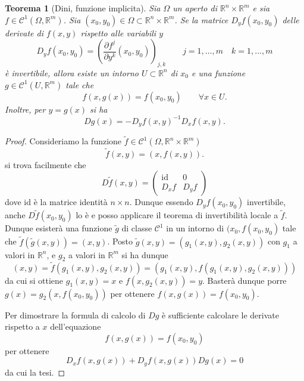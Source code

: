 \documentclass[italian]{article}
\newtheorem{theorem}{Teorema}
\theoremstyle{remark}
\newcommand{\Id}{{\mathrm{id}}}          %
\newcommand{\R}{{\mathbb R}}            %
\newcommand{\CC}{{\mathcal C}}           %
\begin{document}
\begin{theorem}[Dini, funzione implicita]
Sia $\Omega$ un aperto di $\R^n\times \R^m$ e sia $f\in
\CC^1(\Omega,\R^m)$. Sia $(x_0,y_0)\in\Omega\subset \R^n\times \R^m$.
Se la matrice $D_yf(x_0,y_0)$ delle derivate di $f(x,y)$ rispetto alle
variabili $y$
\[
D_yf(x_0,y_0)=\left(\frac{\partial f^j}{\partial y^k} (x_0,y_0)\right)_{j,k}
\qquad j=1,\ldots,m\quad k=1,\ldots,m
\]
\`e invertibile, allora esiste un intorno $U\subset \R^n$ di $x_0$
e una funzione $g\in\CC^1(U,\R^m)$
tale che
\[
        f(x,g(x))=f(x_0,y_0)\qquad \forall x\in U.
\]
Inoltre, per $y=g(x)$ si ha
\[
  Dg(x) = -D_y f(x,y)^{-1} D_x f(x,y).
\]
\end{theorem}
\begin{proof}
Consideriamo la funzione $\tilde f\in\CC^1(\Omega,\R^n\times\R^m)$
\[
        \tilde f(x,y)=(x,f(x,y)).
\]
si trova facilmente che 
\[      
        D\tilde f(x,y) =
        \left(
        \begin{array}{c|c}
        \Id & 0 \\ \hline
        D_x f & D_y f
        \end{array}
        \right)
\]
dove $\Id$ \`e la matrice identit\`a $n\times n$. 
Dunque essendo $D_y f(x_0,y_0)$ invertibile,
 anche $D\tilde f(x_0,y_0)$ lo \`e e
posso applicare il teorema di invertibilit\`a locale a $\tilde f$.
Dunque esister\`a una funzione $\tilde g$ di classe $\CC^1$ in un intorno di
$(x_0,f(x_0,y_0)$ 
tale che $\tilde f(\tilde
g(x,y))=(x,y)$.
Posto $\tilde g(x,y)=(g_1(x,y),g_2(x,y))$ con $g_1$ a valori in
$\R^n$, e $g_2$ a valori in $\R^m$ si ha dunque
\[
        (x,y) 
        = \tilde f(g_1(x,y),g_2(x,y))
        = (g_1(x,y),f(g_1(x,y),g_2(x,y)))
\]
da cui si ottiene $g_1(x,y)=x$ e
$f(x,g_2(x,y))=y$.
Baster\`a dunque porre $g(x)=g_2(x,f(x_0,y_0))$ per ottenere $f(x,g(x))=f(x_0,y_0)$.

Per dimostrare la formula di calcolo di $Dg$ \`e sufficiente
calcolare le derivate rispetto a $x$ dell'equazione
\[
  f(x,g(x))=f(x_0,y_0)
\]
per ottenere
\[
  D_x f(x,g(x)) + D_y f(x,g(x)) Dg(x)=0
\]
da cui la tesi.
\end{proof}
\end{document}
